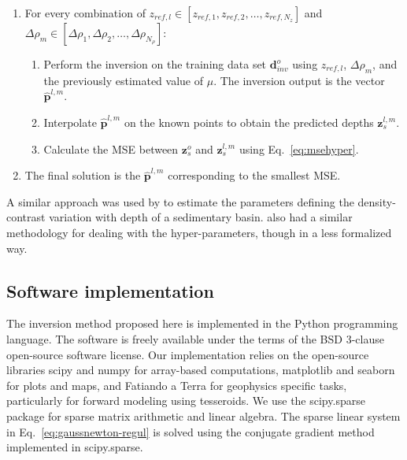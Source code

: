 \documentclass[extra]{gji}
\begin{document}
\begin{enumerate}
    \item For every combination of
        $z_{ref,l} \in [z_{ref,1},z_{ref,2},\ldots,z_{ref,N_z}]$ and
        $\Delta\rho_m \in
         [\Delta\rho_1,\Delta\rho_2,\ldots,\Delta\rho_{N_{\rho}}]$:
    \begin{enumerate}
        \item Perform the inversion on the training data set
            $\mathbf{d}^o_{inv}$ using $z_{ref,l}$, $\Delta\rho_m$, and
            the previously estimated value of $\mu$.
            The inversion output is the vector $\mathbf{\hat{p}}^{l,m}$.
        \item Interpolate $\mathbf{\hat{p}}^{l,m}$
            on the known points to obtain the predicted depths
            $\mathbf{z}_s^{l,m}$.
        \item Calculate the MSE between $\mathbf{z}_s^o$ and
            $\mathbf{z}_s^{l,m}$ using Eq.~\ref{eq:msehyper}.
    \end{enumerate}
    \item The final solution is the $\mathbf{\hat{p}}^{l,m}$ corresponding to
        the smallest MSE.
\end{enumerate}

A similar approach was used by \citet{martins2010}
to estimate the parameters defining
the density-contrast variation with depth
of a sedimentary basin.
\citet{vandermeijde2013} also had
a similar methodology for dealing with the hyper-parameters,
though in a less formalized way.



\subsection{Software implementation}

The inversion method proposed here is implemented in the Python programming
language.
The software is freely available
under the terms of the BSD 3-clause open-source software license.
Our implementation relies on the open-source libraries
scipy and numpy \citep[][ \url{http://scipy.org}]{jones2001}
for array-based computations,
matplotlib \citep[][ \url{http://matplotlib.org}]{hunter2007}
and seaborn
\citep[][ \url{http://stanford.edu/~mwaskom/software/seaborn}]{waskom2015}
for plots and maps,
and Fatiando a Terra \citep[][ \url{http://www.fatiando.org}]{uieda2013}
for geophysics specific tasks,
particularly for forward modeling using tesseroids.
We use the scipy.sparse package for sparse matrix arithmetic and linear
algebra.
The sparse linear system in Eq.~\ref{eq:gaussnewton-regul}
is solved using the conjugate gradient method implemented in scipy.sparse.
\end{document}
